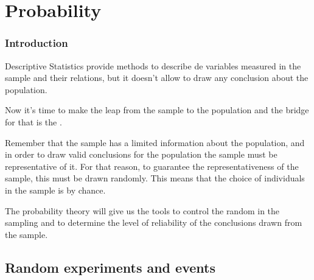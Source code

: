 \section{Probability}



\begin{frame}
\frametitle{Introduction}
Descriptive Statistics provide methods to describe de variables measured in the sample and their relations, but it
doesn't allow to draw any conclusion about the population.

Now it's time to make the leap from the sample to the population and the bridge for that is the
.

Remember that the sample has a limited information about the population, and in order to draw valid conclusions for the
population the sample must be representative of it.
For that reason, to guarantee the representativeness of the sample, this must be drawn randomly. 
This means that the choice of individuals in the sample is by chance. 

The probability theory will give us the tools to control the random in the sampling and to determine the level of
reliability of the conclusions drawn from the sample. 
\end{frame}


\subsection{Random experiments and events}

